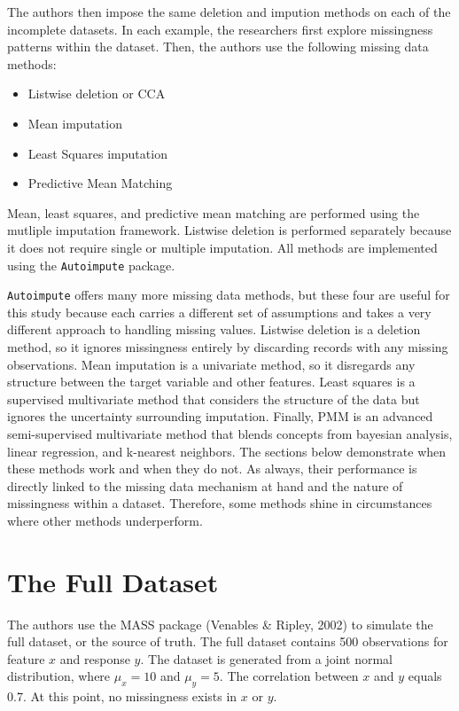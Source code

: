 \documentclass[12pt,oneside]{chicagocapstone}
\providecommand{\tightlist}{%
  \setlength{\itemsep}{0pt}\setlength{\parskip}{0pt}}
\begin{document}
The authors then impose the same deletion and impution methods on each
of the incomplete datasets. In each example, the researchers first
explore missingness patterns within the dataset. Then, the authors use
the following missing data methods:
\begin{itemize}
\tightlist
\item
  Listwise deletion or CCA
\item
  Mean imputation
\item
  Least Squares imputation
\item
  Predictive Mean Matching
\end{itemize}
Mean, least squares, and predictive mean matching are performed using
the mutliple imputation framework. Listwise deletion is performed
separately because it does not require single or multiple imputation.
All methods are implemented using the \texttt{Autoimpute} package.

\texttt{Autoimpute} offers many more missing data methods, but these
four are useful for this study because each carries a different set of
assumptions and takes a very different approach to handling missing
values. Listwise deletion is a deletion method, so it ignores
missingness entirely by discarding records with any missing
observations. Mean imputation is a univariate method, so it disregards
any structure between the target variable and other features. Least
squares is a supervised multivariate method that considers the structure
of the data but ignores the uncertainty surrounding imputation. Finally,
PMM is an advanced semi-supervised multivariate method that blends
concepts from bayesian analysis, linear regression, and k-nearest
neighbors. The sections below demonstrate when these methods work and
when they do not. As always, their performance is directly linked to the
missing data mechanism at hand and the nature of missingness within a
dataset. Therefore, some methods shine in circumstances where other
methods underperform.

\section*{The Full Dataset}\label{the-full-dataset}

The authors use the MASS package (Venables \& Ripley, 2002) to simulate
the full dataset, or the source of truth. The full dataset contains 500
observations for feature \(x\) and response \(y\). The dataset is
generated from a joint normal distribution, where \(\mu_x=10\) and
\(\mu_y=5\). The correlation between \(x\) and \(y\) equals 0.7. At this
point, no missingness exists in \(x\) or \(y\).
\end{document}

